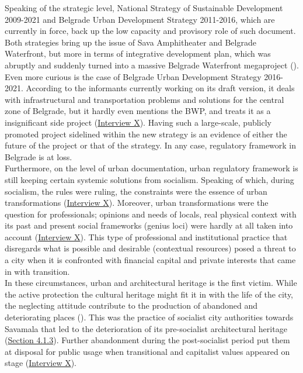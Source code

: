 \documentclass[11pt]{report}
\begin{document}
{Speaking of the strategic level, National Strategy of Sustainable Development 2009-2021 and Belgrade Urban Development Strategy 2011-2016, which are currently in force, back up the low capacity and provisory role of such document.
Both strategies bring up the issue of Sava Amphitheater and Belgrade Waterfront, but more in terms of integrative development plan, which was abruptly and suddenly turned into a massive Belgrade Waterfront megaproject (\cite{NSSD; BUDS; check cultural heritage works}).
\\

Even more curious is the case of Belgrade Urban Development Strategy 2016-2021.
According to the informants currently working on its draft version, it deals with infrastructural and transportation problems and solutions for the central zone of Belgrade, but it hardly even mentions the BWP, and treats it as a insignificant side project (\href{InterviewX}{Interview X}).
Having such a large-scale, publicly promoted project sidelined within the new strategy is an evidence of either the future of the project or that of the strategy.
In any case, regulatory framework in Belgrade is at loss.
\\

Furthermore, on the level of urban documentation, urban regulatory framework is still keeping certain systemic solutions from socialism. Speaking of which, during socialism, the rules were ruling, the constraints were the essence of urban transformations (\href{InterviewX}{Interview X}).
Moreover, urban transformations were the question for professionals; opinions and needs of locals, real physical context with its past and present social frameworks (genius loci) were hardly at all taken into account (\href{InterviewX}{Interview X}).
This type of professional and institutional practice that disregards what is possible and desirable (contextual resources) posed a threat to a city when it is confronted with financial capital and private interests that came in with transition.
\\

In these circumstances, urban and architectural heritage is the first victim.
While the active protection the cultural heritage might fit it in with the life of the city, the neglecting attitude contribute to the production of abandoned and deteriorating places 
(\href{Vanista}{\cite{doytchinov_urban_2015}}).
This was the practice of socialist city authorities towards Savamala that led to the deterioration of its pre-socialist architectural heritage (\href{Section 4.1.3}{Section 4.1.3}).
Further abandonment during the post-socialist period put them at disposal for public usage when transitional and capitalist values appeared on stage
(\href{InterviewX}{Interview X}).
\\

}
\end{document}
